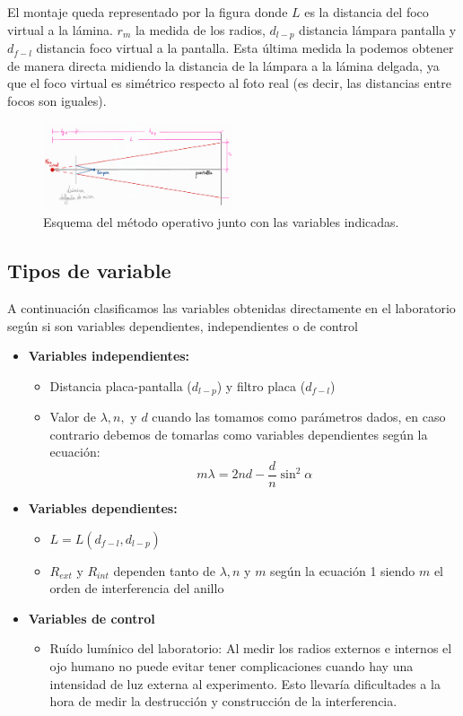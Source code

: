 \documentclass[11pt,letterpaper,twocolumn]{article}
\begin{document}
El montaje queda representado por la figura %
donde $L$ es la distancia del foco virtual a la lámina. $r_m$ la medida de los radios, $d_{l-p}$ distancia lámpara pantalla y $d_{f-l}$ distancia foco virtual a la pantalla. Esta última medida la podemos obtener de manera directa midiendo la distancia de la lámpara a la lámina delgada, ya que el foco virtual es simétrico respecto al foto real (es decir, las distancias entre focos son iguales).
\begin{figure}[H]
	\centering
	\includegraphics[width=0.5\textwidth]{imagen/diagramaexp.png}
	\caption{\small Esquema del método operativo junto con las variables indicadas.}
\end{figure}
\subsection{Tipos de variable }
A continuación clasificamos las variables obtenidas directamente en el laboratorio según si son variables dependientes, independientes o de control
\begin{itemize}
	\item {\textbf{Variables independientes:  }}
	\begin{itemize}
		\item Distancia placa-pantalla ($d_{l-p}$) y filtro placa ($d_{f-l}$)
		\item Valor de $\lambda, n,$ y $d$ cuando las tomamos como parámetros dados, en caso contrario debemos de tomarlas como variables dependientes según la ecuación:
			\begin{equation}
				m\lambda=2nd-\frac{d}{n}\sin^2 \alpha
				\label{orden}
			\end{equation}
	\end{itemize}

	\item{\textbf{Variables dependientes: }} 
		\begin{itemize}
			\item $L=L(d_{f-l}, d_{l-p})$ 
			\item $R_{ext}$ y $R_{int}$ dependen tanto de $\lambda, n$ y $m$ según la ecuación 1 siendo $m$ el orden de interferencia del anillo 
		\end{itemize}
	\item{\textbf{Variables de control}}
		\begin{itemize}
			\item Ruído lumínico del laboratorio: Al medir los radios externos e internos el ojo humano no puede evitar tener complicaciones cuando hay una intensidad de luz externa al experimento. Esto llevaría dificultades a la hora de medir la destrucción y construcción de la interferencia.
		\end{itemize}
\end{itemize}
\end{document}
